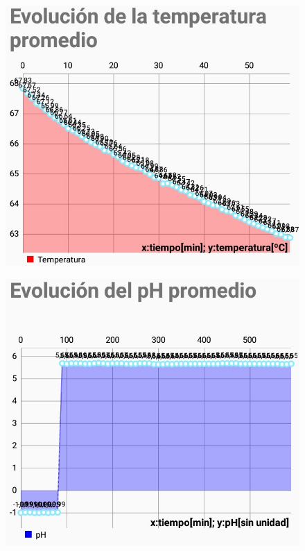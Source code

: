             \begin{figure}[H]
                \centering
                \includegraphics[scale=0.65]{Pruebas/SimpleEvolTempProm.jpg}
                \label{fig:SimpTempProm}
            \end{figure}
           
            \begin{figure}[H]
                \centering
                \includegraphics[scale=0.65]{Pruebas/SimpleEvolPHProm.jpg}
                \label{fig:SimpPHProm}
            \end{figure}

